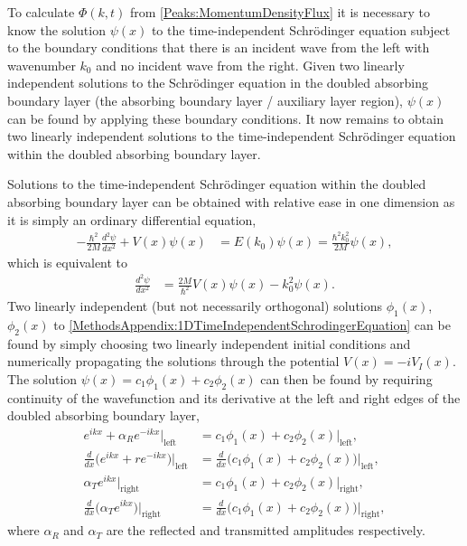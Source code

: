 To calculate $\Phi(k, t)$ from \eqref{Peaks:MomentumDensityFlux} it is necessary to know the solution $\psi(x)$ to the time-independent Schrödinger equation subject to the boundary conditions that there is an incident wave from the left with wavenumber $k_0$ and no incident wave from the right. Given two linearly independent solutions to the Schrödinger equation in the doubled absorbing boundary layer (the absorbing boundary layer / auxiliary layer region), $\psi(x)$ can be found by applying these boundary conditions. It now remains to obtain two linearly independent solutions to the time-independent Schrödinger equation within the doubled absorbing boundary layer.

Solutions to the time-independent Schrödinger equation within the doubled absorbing boundary layer can be obtained with relative ease in one dimension as it is simply an ordinary differential equation,
\begin{align}
    -\frac{\hbar^2}{2M}\frac{d^2 \psi}{dx^2} + V(x) \psi(x) &= E(k_0) \psi(x) = \frac{\hbar^2 k_0^2}{2M} \psi(x),
\end{align}
which is equivalent to
\begin{align}
    \frac{d^2 \psi}{dx^2} &= \frac{2 M}{\hbar^2} V(x) \psi(x) - k_0^2 \psi(x).
    \label{MethodsAppendix:1DTimeIndependentSchrodingerEquation}
\end{align}
Two linearly independent (but not necessarily orthogonal) solutions $\phi_1(x)$, $\phi_2(x)$ to \eqref{MethodsAppendix:1DTimeIndependentSchrodingerEquation} can be found by simply choosing two linearly independent initial conditions and numerically propagating the solutions through the potential $V(x) = -i V_I(x)$. The solution $\psi(x) = c_1 \phi_1(x) + c_2 \phi_2(x)$ can then be found by requiring continuity of the wavefunction and its derivative at the left and right edges of the doubled absorbing boundary layer,
\begin{subequations}
    \label{MethodsAppendix:1DBoundaryConditions}
    \begin{align}
        e^{i k x} + \alpha_R e^{-i k x} \Big|_\text{left} &=  c_1 \phi_1(x) + c_2 \phi_2(x) \Big|_\text{left}, \\
        \frac{d}{dx}\big( e^{i k x} + r e^{-i k x}\big) \Big|_\text{left} &=  \frac{d}{dx} \big( c_1 \phi_1(x) + c_2 \phi_2(x) \big) \Big|_\text{left},\\
        \alpha_T e^{i k x} \Big|_\text{right} &= c_1 \phi_1(x) + c_2 \phi_2(x) \Big|_\text{right}, \\
        \frac{d}{dx} \big( \alpha_T e^{i k x} \big) \Big|_\text{right} &= \frac{d}{dx} \big( c_1 \phi_1(x) + c_2 \phi_2(x) \big) \Big|_\text{right},
    \end{align}
\end{subequations}
where $\alpha_R$ and $\alpha_T$ are the reflected and transmitted amplitudes respectively. 

